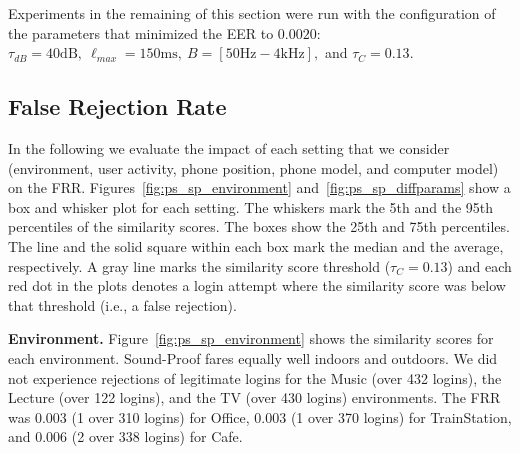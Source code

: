 Experiments in the remaining of this section were run with the configuration of the parameters that minimized the EER to $0.0020$:
$\tau_{dB}=40\text{dB},\ \ell_{max}=150\text{ms},\ B=[50\text{Hz}-4\text{kHz}],$ and $\tau_C=0.13$.


\subsection{False Rejection Rate}

In the following we evaluate the impact of each setting that we consider (environment, user activity, phone position, phone model, and computer model) on the FRR.
Figures~\ref{fig:ps_sp_environment} and~\ref{fig:ps_sp_diffparams} show a box and whisker plot for each setting.
The whiskers mark the 5th and the 95th percentiles of the similarity scores.
The boxes show the 25th and 75th percentiles.
The line and the solid square within each box mark the median and the average, respectively.
A gray line marks the similarity score threshold ($\tau_C=0.13$) and each red dot in the plots denotes a login attempt where the similarity score was below that threshold (i.e., a false rejection).

\noindent\textbf{Environment.}
Figure~\ref{fig:ps_sp_environment} shows the similarity scores for each environment.
Sound-Proof fares equally well indoors and outdoors.
We did not experience rejections of legitimate logins for the Music (over 432 logins), the Lecture (over 122 logins), and the TV (over 430 logins) environments.
The FRR was 0.003 (1 over 310 logins) for Office,
0.003 (1 over 370 logins) for TrainStation, and
0.006 (2 over 338 logins) for Cafe. %

